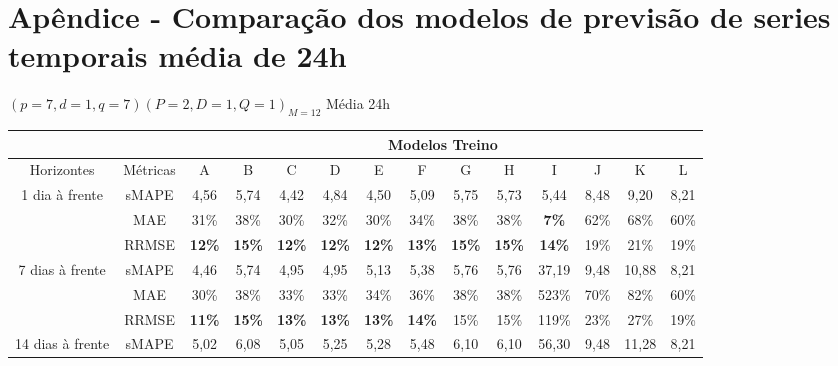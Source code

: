 
\section{Ap\^endice - Compara\c c\~ao dos modelos de previs\~ao de series temporais m\'edia de 24h}\label{sec:comtb24}



$(p = 7,d = 1,q = 7) (P = 2,D = 1,Q = 1)_{M = 12}$ Média 24h

\begin{table}[H]
	\begin{tabular}{@{}cccccccccccccc@{}}
		\toprule
		\textbf{}                         &          & \multicolumn{12}{c}{Modelos Treino}                                                                                                                                 \\ \midrule
		Horizontes                        & Métricas & A             & B             & C             & D             & E             & F             & G             & H             & I             & J    & K     & L    \\
		\multirow{3}{*}{1 dia à frente}   & sMAPE    & 4,56          & 5,74          & 4,42          & 4,84          & 4,50          & 5,09          & 5,75          & 5,73          & 5,44          & 8,48 & 9,20  & 8,21 \\
		& MAE      & 31\%          & 38\%          & 30\%          & 32\%          & 30\%          & 34\%          & 38\%          & 38\%          & \textbf{7\%}  & 62\% & 68\%  & 60\% \\
		& RRMSE    & \textbf{12\%} & \textbf{15\%} & \textbf{12\%} & \textbf{12\%} & \textbf{12\%} & \textbf{13\%} & \textbf{15\%} & \textbf{15\%} & \textbf{14\%} & 19\% & 21\%  & 19\% \\
		\multirow{3}{*}{7 dias à frente}  & sMAPE    & 4,46          & 5,74          & 4,95          & 4,95          & 5,13          & 5,38          & 5,76          & 5,76          & 37,19         & 9,48 & 10,88 & 8,21 \\
		& MAE      & 30\%          & 38\%          & 33\%          & 33\%          & 34\%          & 36\%          & 38\%          & 38\%          & 523\%         & 70\% & 82\%  & 60\% \\
		& RRMSE    & \textbf{11\%} & \textbf{15\%} & \textbf{13\%} & \textbf{13\%} & \textbf{13\%} & \textbf{14\%} & 15\%          & 15\%          & 119\%         & 23\% & 27\%  & 19\% \\
		\multirow{3}{*}{14 dias à frente} & sMAPE    & 5,02          & 6,08          & 5,05          & 5,25          & 5,28          & 5,48          & 6,10          & 6,10          & 56,30         & 9,48 & 11,28 & 8,21 \\

\end{tabular}
\end{table}

